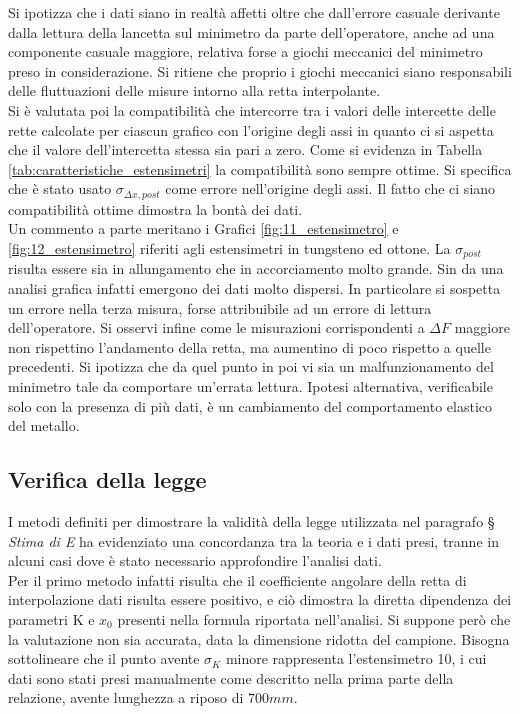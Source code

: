 \documentclass[a4paper,11pt,oneside]{article}
\begin{document}
Si ipotizza che i dati siano in realtà affetti oltre che dall'errore casuale derivante dalla lettura della lancetta sul minimetro da parte dell'operatore, anche ad una componente casuale maggiore, relativa forse a giochi meccanici del minimetro preso in considerazione. Si ritiene che proprio i giochi meccanici siano responsabili delle fluttuazioni delle misure intorno alla retta interpolante.\\
Si è valutata poi la compatibilità che intercorre tra i valori delle intercette delle rette calcolate per ciascun grafico con l'origine degli assi in quanto ci si aspetta che il valore dell'intercetta stessa sia pari a zero. Come si evidenza in Tabella \ref{tab:caratteristiche_estensimetri} la compatibilità sono sempre ottime. Si specifica che è stato usato $\sigma_{\Delta x, post}$ come errore nell'origine degli assi. Il fatto che ci siano compatibilità ottime dimostra la bontà dei dati.\\
Un commento a parte meritano i Grafici \ref{fig:11_estensimetro} e \ref{fig:12_estensimetro} riferiti agli estensimetri in tungsteno ed ottone. La $\sigma_{post}$ risulta essere sia in allungamento che in accorciamento molto grande. Sin da una analisi grafica infatti emergono dei dati molto dispersi. In particolare si sospetta un errore nella terza misura, forse attribuibile ad un errore di lettura dell'operatore. Si osservi infine come le misurazioni corrispondenti a $\Delta F$ maggiore non rispettino l'andamento della retta, ma aumentino di poco rispetto a quelle precedenti. Si ipotizza che da quel punto in poi vi sia un malfunzionamento del minimetro tale da comportare un'errata lettura. Ipotesi alternativa, verificabile solo con la presenza di più dati, è un cambiamento del comportamento elastico del metallo. 


\subsection{Verifica della legge}
I metodi definiti per dimostrare la validità della legge utilizzata nel paragrafo \S \textit{ Stima di E} ha evidenziato una concordanza tra la teoria e i dati presi, tranne in alcuni casi dove è stato necessario approfondire l'analisi dati.\\
Per il primo metodo infatti risulta che il coefficiente angolare della retta di interpolazione dati risulta essere positivo, e ciò dimostra la diretta dipendenza dei parametri K e $x_0$ presenti nella formula riportata nell'analisi. Si suppone però che la valutazione non sia accurata, data la dimensione ridotta del campione.
Bisogna sottolineare che il punto avente $\sigma_K$ minore rappresenta l'estensimetro 10, i cui dati sono stati presi manualmente come descritto nella prima parte della relazione, avente lunghezza a riposo di $700\si{mm}$.
\end{document}
